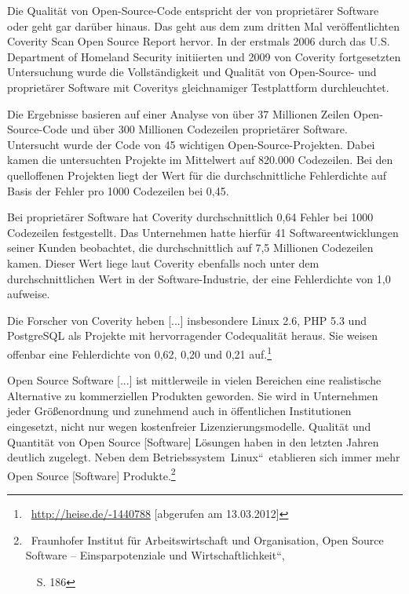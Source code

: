 \documentclass[a4paper]{article}
\begin{document}
{
Die Qualit\"at von Open-Source-Code entspricht der von propriet\"arer
Software oder geht gar dar\"uber hinaus. Das geht aus dem zum dritten
Mal ver\"offentlichten Coverity Scan Open Source Report hervor. In der
erstmals 2006 durch das U.S. Department of Homeland Security
initiierten und 2009 von Coverity fortgesetzten Untersuchung wurde die
Vollst\"andigkeit und Qualit\"at von Open-Source- und propriet\"arer
Software mit Coveritys gleichnamiger Testplattform durchleuchtet.}

{
Die Ergebnisse basieren auf einer Analyse von \"uber 37 Millionen Zeilen
Open-Source-Code und \"uber 300 Millionen Codezeilen propriet\"arer
Software. Untersucht wurde der Code von 45 wichtigen
Open-Source-Projekten. Dabei kamen die untersuchten Projekte im
Mittelwert auf 820.000 Codezeilen. Bei den quelloffenen Projekten liegt
der Wert f\"ur die durchschnittliche Fehlerdichte auf Basis der Fehler
pro 1000 Codezeilen bei 0,45.}

{
Bei propriet\"arer Software hat Coverity durchschnittlich 0,64 Fehler
bei 1000 Codezeilen festgestellt. Das Unternehmen hatte hierf\"ur 41
Softwareentwicklungen seiner Kunden beobachtet, die durchschnittlich
auf 7,5 Millionen Codezeilen kamen. Dieser Wert liege laut Coverity
ebenfalls noch unter dem durchschnittlichen Wert in der
Software-Industrie, der eine Fehlerdichte von 1,0 aufweise.}

{
Die Forscher von Coverity heben [...] insbesondere Linux 2.6, PHP 5.3
und PostgreSQL als Projekte mit hervorragender Codequalit\"at heraus.
Sie weisen offenbar eine Fehlerdichte von 0,62, 0,20 und 0,21
auf.{\guillemotleft}\footnote{\ \url{http://heise.de/-1440788}
[abgerufen am 13.03.2012]}}



\bigskip


\bigskip

{
{\guillemotright}Open Source Software [...] ist mittlerweile in vielen
Bereichen eine realistische Alternative zu kommerziellen Produkten
geworden. Sie wird in Unternehmen jeder Gr\"o{\ss}enordnung und
zunehmend auch in \"offentlichen Institutionen eingesetzt, nicht nur
wegen kostenfreier Lizenzierungsmodelle. Qualit\"at und Quantit\"at von
Open Source [Software] L\"osungen haben in den letzten Jahren deutlich
zugelegt. Neben dem
Betriebssystem~{\quotedblbase}Linux{\textquotedblleft}~etablieren sich
immer mehr Open Source [Software]
Produkte.{\guillemotleft}\footnote{\ Fraunhofer Institut f\"ur
Arbeitswirtschaft und Organisation, {\quotedblbase}Open Source Software
-- Einsparpotenziale und Wirtschaftlichkeit{\textquotedblleft},\par
\ \ S. 186}}
\end{document}
